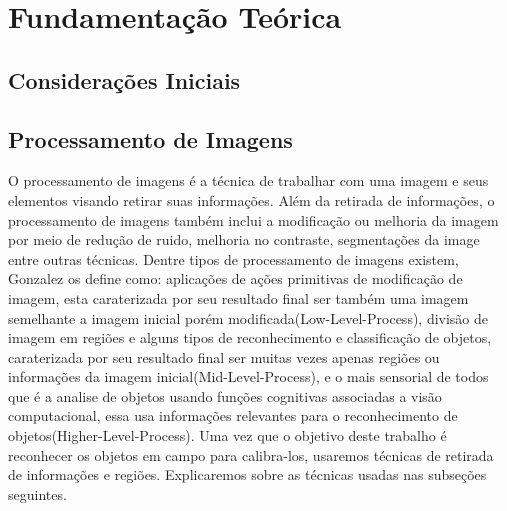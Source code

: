 \graphicspath{{figuras/}}
\chapter{Fundamentação Teórica} \label{Cap:Fundamentacao}

\section{Considerações Iniciais}

\section{Processamento de Imagens}

O processamento de imagens é a técnica de trabalhar com uma imagem e seus elementos visando retirar suas informações\cite{Albuquerque:2001}. Além da retirada de informações, o processamento de imagens também inclui a modificação ou melhoria da imagem por meio de redução de ruido, melhoria no contraste, segmentações da image entre outras técnicas. Dentre tipos de processamento de imagens existem, Gonzalez\cite{Gonzalez:2008} os define como: aplicações de ações primitivas de modificação de imagem, esta caraterizada por seu resultado final ser também uma imagem semelhante a imagem inicial porém modificada(Low-Level-Process), divisão de imagem em regiões e alguns tipos de reconhecimento e classificação de objetos, caraterizada por seu resultado final ser muitas vezes apenas regiões ou informações da imagem inicial(Mid-Level-Process), e o mais sensorial de todos que é a analise de objetos usando funções cognitivas associadas a visão computacional, essa usa informações relevantes para o reconhecimento de objetos(Higher-Level-Process). 
Uma vez que o objetivo deste trabalho é reconhecer os objetos em campo para calibra-los, usaremos técnicas de retirada de informações e regiões. Explicaremos sobre as técnicas usadas nas subseções seguintes.

